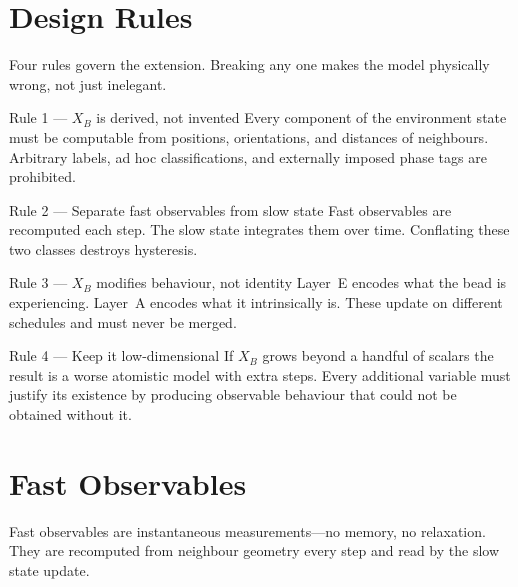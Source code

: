 \documentclass[11pt]{article}
\begin{document}
\section{Design Rules}

Four rules govern the extension.  Breaking any one makes the model
physically wrong, not just inelegant.

\begin{rulebox}{Rule 1 --- $X_B$ is derived, not invented}
Every component of the environment state must be computable from positions,
orientations, and distances of neighbours.  Arbitrary labels, ad hoc
classifications, and externally imposed phase tags are prohibited.
\end{rulebox}

\begin{rulebox}{Rule 2 --- Separate fast observables from slow state}
Fast observables are recomputed each step.  The slow state integrates them
over time.  Conflating these two classes destroys hysteresis.
\end{rulebox}

\begin{rulebox}{Rule 3 --- $X_B$ modifies behaviour, not identity}
Layer~E encodes what the bead is experiencing.  Layer~A encodes what it
intrinsically is.  These update on different schedules and must never be
merged.
\end{rulebox}

\begin{rulebox}{Rule 4 --- Keep it low-dimensional}
If $X_B$ grows beyond a handful of scalars the result is a worse atomistic
model with extra steps.  Every additional variable must justify its existence
by producing observable behaviour that could not be obtained without it.
\end{rulebox}

\section{Fast Observables}
\label{sec:observables}

Fast observables are instantaneous measurements---no memory, no relaxation.
They are recomputed from neighbour geometry every step and read by the slow
state update.
\end{document}
